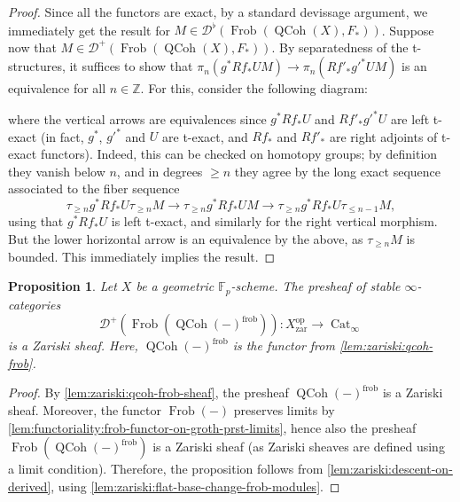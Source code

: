 \documentclass{article}
\theoremstyle{definition}
\theoremstyle{definition}
\theoremstyle{definition}
\theoremstyle{plain}
\theoremstyle{plain}
\theoremstyle{plain}
\theoremstyle{plain}
\theoremstyle{plain}
\theoremstyle{plain}
\newtheorem{prop}[defn]{Proposition}
\theoremstyle{plain}
\theoremstyle{plain}
\theoremstyle{remark}
\theoremstyle{remark}
\theoremstyle{plain}
\theoremstyle{plain}
\theoremstyle{plain}
\theoremstyle{plain}
\theoremstyle{plain}
\newcommand{\Z}{\mathbb{Z}}
\newcommand{\Fp}{\mathbb{F}_p}
\newcommand{\op}[1]{#1^{\operatorname{op}}}
\newcommand{\QCoh}[1]{\operatorname{QCoh}(#1)}
\newcommand{\Frob}[2]{\operatorname{Frob}(#1, #2)}
\newcommand{\FrobSingle}[1]{\operatorname{Frob}(#1)}
\newcommand{\Cat}[1]{\mathcal{#1}}
\newcommand{\CatInf}{\operatorname{Cat}_{\infty}}
\newcommand{\zar}{\operatorname{zar}}
\newcommand{\frob}{\operatorname{frob}}
\begin{document}
\begin{proof}
    Since all the functors are exact, by a standard devissage argument,
    we immediately get the result for $M \in \Cat D^\flat(\Frob{\QCoh{X}}{F_*})$.
    Suppose now that $M \in \Cat D^+(\Frob{\QCoh{X}}{F_*})$.
    By separatedness of the t-structures, it suffices to show that 
    $\pi_n(g^* Rf_* UM) \to \pi_n(Rf'_* g'^* UM)$ is an equivalence for all $n \in \Z$.
    For this, consider the following diagram:
    \begin{center}
    \end{center}
    where the vertical arrows are equivalences 
    since $g^* Rf_* U$ and $Rf'_* g'^* U$ are left t-exact (in fact, $g^*$, $g'^*$ and $U$ are t-exact,
    and $Rf_*$ and $Rf'_*$ are right adjoints of t-exact functors).
    Indeed, this can be checked on homotopy groups;
    by definition they vanish below $n$, and in degrees $\ge n$ they agree 
    by the long exact sequence associated to the fiber sequence 
    \begin{equation*}
        \tau_{\ge n} g^* Rf_* U \tau_{\ge n} M \to \tau_{\ge n} g^* Rf_* U M \to \tau_{\ge n} g^* Rf_* U \tau_{\le n-1} M,
    \end{equation*}
    using that $g^* Rf_* U$ is left t-exact, and similarly for the right vertical morphism.
    But the lower horizontal arrow is an equivalence by the above, as $\tau_{\ge n} M$
    is bounded.
    This immediately implies the result.
\end{proof}

\begin{prop} \label{lem:zariski:left-sep-derived-category-sheaf}
    Let $X$ be a geometric $\Fp$-scheme.
    The presheaf of stable $\infty$-categories 
    \begin{equation*}
        \Cat D^+(\FrobSingle{\QCoh{-}^{\frob}}) \colon \op{X}_{\zar} \to \CatInf
    \end{equation*}
    is a Zariski sheaf.
    Here, $\QCoh{-}^{\frob}$ is the functor from \cref{lem:zariski:qcoh-frob}.
\end{prop}
\begin{proof}
    By \cref{lem:zariski:qcoh-frob-sheaf}, the presheaf $\QCoh{-}^{\frob}$ is a Zariski sheaf.
    Moreover, the functor $\FrobSingle{-}$ preserves limits by \cref{lem:functoriality:frob-functor-on-groth-prst-limits},
    hence also the presheaf $\FrobSingle{\QCoh{-}^{\frob}}$ is a Zariski sheaf (as Zariski sheaves are defined using a limit condition).
    Therefore, the proposition follows from \cref{lem:zariski:descent-on-derived},
    using \cref{lem:zariski:flat-base-change-frob-modules}.
\end{proof}
\end{document}

